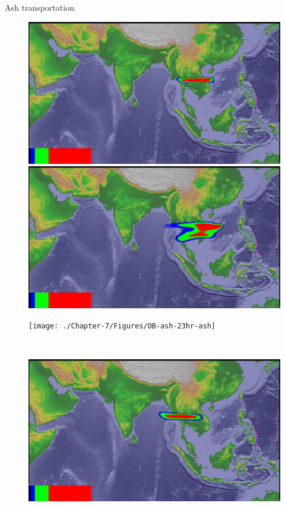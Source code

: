 \documentclass{beamer}
\begin{document}
\begin{frame}{Ash transportation}
\begin{figure}[!htb]
    \centering
    \begin{minipage}{.295\textwidth}
        \centering
        \includegraphics[width=0.99 \textwidth]{./Chapter-7/Figures/bent-23hr-ash}
    \end{minipage}%
    \begin{minipage}{.295\textwidth}
        \centering
        \includegraphics[width=0.99 \textwidth]{./Chapter-7/Figures/SPH-Plume-23hr-ash}
    \end{minipage}%
    \begin{minipage}{.295\textwidth}
        \centering
        \texttt{[image: ./Chapter-7/Figures/OB-ash-23hr-ash]}
    \end{minipage}%
    \\
        \begin{minipage}{.295\textwidth}
        \centering
        \includegraphics[width=0.99 \textwidth]{./Chapter-7/Figures/bent-31hr-ash}

\end{minipage}
\end{figure}
\end{frame}
\end{document}
